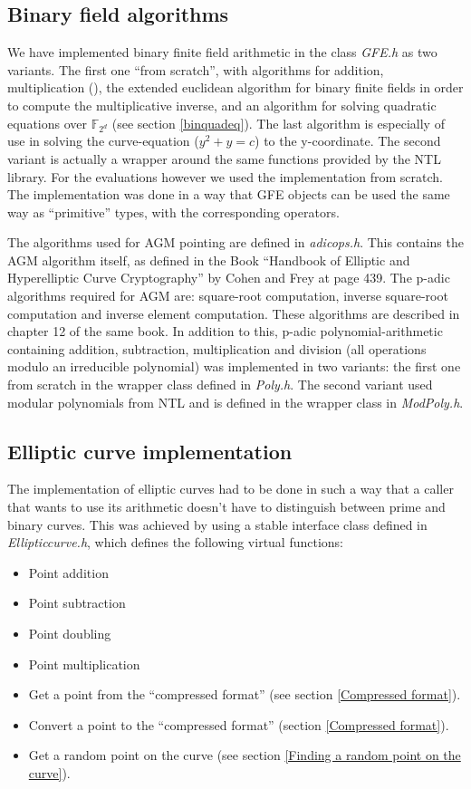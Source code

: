 \documentclass[11pt,english]{article}
\begin{document}
\subsection{Binary field algorithms}
We have implemented binary finite field arithmetic in the class \emph{GFE.h} as two variants. The first one ``from scratch'', with algorithms for addition, multiplication (\cite{715867}), the extended euclidean algorithm for binary finite fields in order to compute the multiplicative inverse, and an algorithm for solving quadratic equations over $\mathbb{F}_{2^d}$ (see section \ref{binquadeq}). The last algorithm is especially of use in solving the curve-equation ($y^2+y=c$) to the y-coordinate. The second variant is actually a wrapper around the same functions provided by the NTL library. For the evaluations however we used the implementation from scratch. The implementation was done in a way that GFE objects can be used the same way as ``primitive'' types, with the corresponding operators.

The algorithms used for AGM pointing are defined in \emph{adicops.h}. This contains the AGM algorithm itself, as defined in the Book ``Handbook of Elliptic and Hyperelliptic Curve Cryptography'' by Cohen and Frey \cite{handbook} at page 439. The p-adic algorithms required for AGM are: square-root computation, inverse square-root computation and inverse element computation. These algorithms are described in chapter 12 of the same book. In addition to this, p-adic polynomial-arithmetic containing addition, subtraction, multiplication and division (all operations modulo an irreducible polynomial) was implemented in two variants: the first one from scratch in the wrapper class defined in \emph{Poly.h}. The second variant used modular polynomials from NTL and is defined in the wrapper class in \emph{ModPoly.h}.

\subsection{Elliptic curve implementation}
The implementation of elliptic curves had to be done in such a way that a caller that wants to use its arithmetic doesn't have to distinguish between prime and binary curves. This was achieved by using a stable interface class defined in \emph{Ellipticcurve.h}, which defines the following virtual functions:

\begin{itemize}
 \item Point addition
 \item Point subtraction
 \item Point doubling
 \item Point multiplication
 \item Get a point from the ``compressed format'' (see section \ref{Compressed format}).
 \item Convert a point to the ``compressed format'' (section \ref{Compressed format}).
 \item Get a random point on the curve (see section \ref{Finding a random point on the curve}).
\end{itemize}
\end{document}
